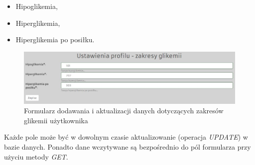 \begin{itemize}
	\item Hipoglikemia, 
	\item Hiperglikemia,
	\item Hiperglikemia po posiłku.
\end{itemize}

\begin{figure}[h]
	\centering\includegraphics[scale=0.5]{images/profile_settings.jpg}
	\caption{Formularz dodawania i aktualizacji danych dotyczących zakresów glikemii użytkownika}
	\label{Rys:profileSettings}
\end{figure}


Każde pole może być w dowolnym czasie aktualizowanie (operacja \textit{UPDATE}) w bazie danych. Ponadto dane wczytywane są bezpośrednio do pól formularza przy użyciu metody \textit{GET}. 